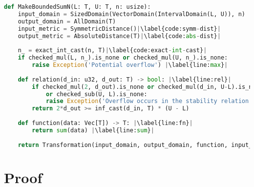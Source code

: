 \documentclass[11pt,a4paper]{article}
\theoremstyle{definition}
\begin{document}
\begin{lstlisting}[language=Python, escapechar=|]
def MakeBoundedSumN(L: T, U: T, n: usize):
    input_domain = SizedDomain(VectorDomain(IntervalDomain(L, U)), n)
    output_domain = AllDomain(T)
    input_metric = SymmetricDistance()|\label{code:symm-dist}|
    output_metric = AbsoluteDistance(T)|\label{code:abs-dist}|
    
    n_ = exact_int_cast(n, T)|\label{code:exact-int-cast}|
    if checked_mul(L, n_).is_none or checked_mul(U, n_).is_none: 
        raise Exception('Potential overflow') |\label{line:max}|
    
    def relation(d_in: u32, d_out: T) -> bool: |\label{line:rel}|
        if checked_mul(2, d_out).is_none or checked_mul(d_in, U-L).is_none
            or checked_sub(U, L).is_none:
            raise Exception('Overflow occurs in the stability relation')
        return 2*d_out >= inf_cast(d_in, T) * (U - L)
    
    def function(data: Vec[T]) -> T: |\label{line:fn}|
        return sum(data) |\label{line:sum}|
    
    return Transformation(input_domain, output_domain, function, input_metric, output_metric, stability_relation = relation)
\end{lstlisting}

\section{Proof}
\end{document}

